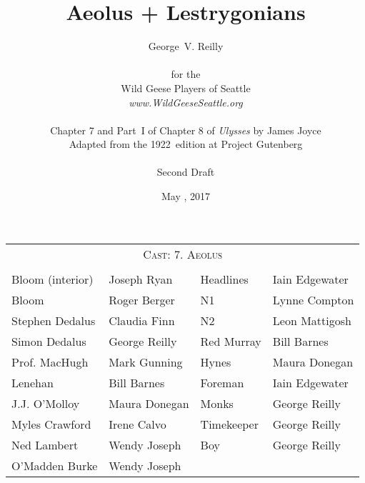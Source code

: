 



\title{\Huge Aeolus + Lestrygonians}
\author{George~V. Reilly\\
\\
{\small for the}\\
Wild Geese Players of Seattle\\
{\emph{www.WildGeeseSeattle.org}}\\
\\
{\small Chapter 7 and Part~I of Chapter 8 of \emph{Ulysses} by James Joyce}\\
{\small Adapted from the 1922~edition at Project Gutenberg}
\\
\\
{\small Second Draft}}
\date{May , 2017}
\raggedbottom



\maketitle
\thispagestyle{empty}
\pagebreak

\begin{tabular}{l p{5cm} l p{5cm}}
    \multicolumn{4}{c}{\Large \textsc{Cast: 7. Aeolus}} \\
\\
Bloom (interior)        & Joseph Ryan       & Headlines               & Iain Edgewater \\
Bloom                   & Roger Berger      & N1                      & Lynne Compton \\
Stephen Dedalus         & Claudia Finn      & N2                      & Leon Mattigosh \\
Simon Dedalus           & George Reilly     & Red Murray              & Bill Barnes \\
Prof. MacHugh           & Mark Gunning      & Hynes                   & Maura Donegan \\
Lenehan                 & Bill Barnes       & Foreman                 & Iain Edgewater \\
J.J. O'Molloy           & Maura Donegan     & Monks                   & George Reilly \\
Myles Crawford          & Irene Calvo       & Timekeeper              & George Reilly \\
Ned Lambert             & Wendy Joseph      & Boy                     & George Reilly \\
O'Madden Burke          & Wendy Joseph      \\
\end{tabular}

